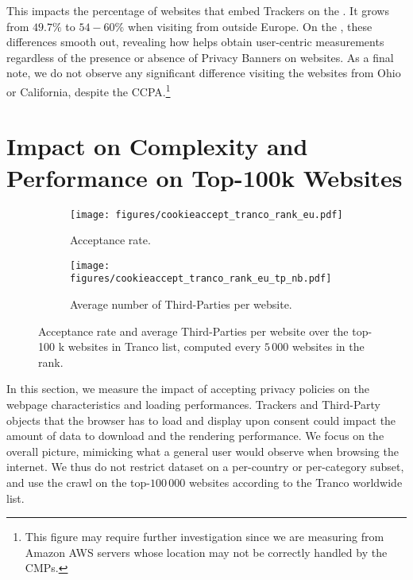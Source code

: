 This impacts the percentage of websites that embed Trackers on the \BEFORE. It grows from $49.7\%$ to $54-60\%$ when visiting from outside Europe. On the \AFTER, these differences smooth out, revealing how \TOOL helps obtain user-centric measurements regardless of the presence or absence of Privacy Banners on websites. As a final note, we do not observe any significant difference visiting the websites from Ohio or California, despite the CCPA.\footnote{This figure may require further investigation since we are measuring from Amazon AWS servers whose location may not be correctly handled by the CMPs.}



\section{Impact on Complexity and Performance on Top-100k Websites}
\label{sec:performance}

\begin{figure}[!t]
    \centering
    \begin{subfigure}[t]{0.495\columnwidth}
        \texttt{[image: figures/cookieaccept\_tranco\_rank\_eu.pdf]}
        \caption{Acceptance rate.}
        \label{fig:tranco_rank}
    \end{subfigure}
    \begin{subfigure}[t]{0.495\columnwidth}
        \texttt{[image: figures/cookieaccept\_tranco\_rank\_eu\_tp\_nb.pdf]}
        \caption{Average number of Third-Parties per website.}
        \label{fig:tranco_tp}
    \end{subfigure}    
     \caption{Acceptance rate and average Third-Parties per website over the top-100 k websites in Tranco list, computed every $5\,000$ websites in the rank.}
    \label{fig:tranco}   
\end{figure}

In this section, we measure the impact of accepting privacy policies on the webpage characteristics and loading performances. Trackers and Third-Party objects that the browser has to load and display upon consent could impact the amount of data to download and the rendering performance. We focus on the overall picture, mimicking what a general user would observe when browsing the internet. We thus do not restrict dataset on a per-country or per-category subset, and use the crawl on the top-$100\,000$ websites according to the Tranco worldwide list. 

